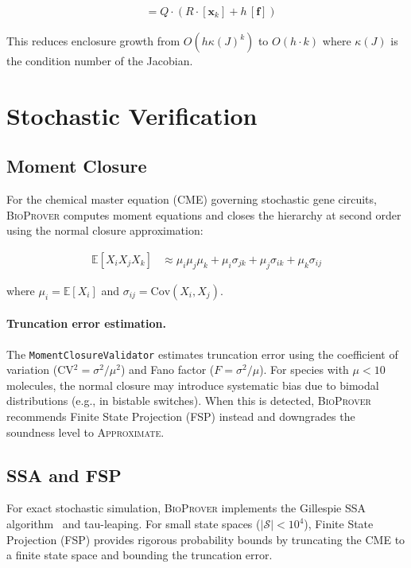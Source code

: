 \documentclass[11pt]{article}
\newcommand{\bioprover}{\textsc{BioProver}}
\begin{document}
\begin{align}
[\mathbf{x}_{k+1}] &= Q \cdot (R \cdot [\mathbf{x}_k] + h\,[\mathbf{f}])
\end{align}

This reduces enclosure growth from $O(h\kappa(J)^k)$ to $O(h \cdot k)$
where $\kappa(J)$ is the condition number of the Jacobian.

\section{Stochastic Verification}
\label{app:stochastic}

\subsection{Moment Closure}

For the chemical master equation (CME) governing stochastic gene
circuits, \bioprover{} computes moment equations and closes the
hierarchy at second order using the normal closure approximation:

\begin{align}
\mathbb{E}[X_i X_j X_k] &\approx \mu_i \mu_j \mu_k
  + \mu_i \sigma_{jk} + \mu_j \sigma_{ik} + \mu_k \sigma_{ij}
\end{align}

where $\mu_i = \mathbb{E}[X_i]$ and
$\sigma_{ij} = \text{Cov}(X_i, X_j)$.

\paragraph{Truncation error estimation.}
The \texttt{MomentClosureValidator} estimates truncation error using
the coefficient of variation (CV$^2 = \sigma^2/\mu^2$) and Fano
factor ($F = \sigma^2/\mu$). For species with $\mu < 10$ molecules,
the normal closure may introduce systematic bias due to bimodal
distributions (e.g., in bistable switches). When this is detected,
\bioprover{} recommends Finite State Projection (FSP) instead and
downgrades the soundness level to \textsc{Approximate}.

\subsection{SSA and FSP}

For exact stochastic simulation, \bioprover{} implements the
Gillespie SSA algorithm~\cite{gillespie1977exact} and tau-leaping.
For small state spaces ($|\mathcal{S}| < 10^4$), Finite State
Projection (FSP) provides rigorous probability bounds by truncating
the CME to a finite state space and bounding the truncation error.
\end{document}
